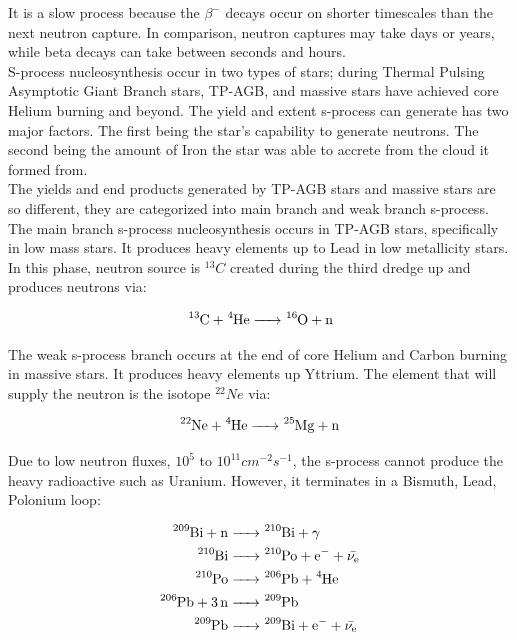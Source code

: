 \documentclass{article}
\begin{document}
 It is a slow process because the $\beta^{-}$ decays occur on shorter timescales than the next neutron capture. In comparison, 
neutron captures may take days or years, while beta decays can take between seconds and hours.\\

 S-process nucleosynthesis occur in two types of stars; during Thermal Pulsing Asymptotic Giant Branch stars, TP-AGB, and massive stars 
have achieved core Helium burning and beyond. The yield and extent s-process can generate has two major factors. The first being the 
star's capability to generate neutrons. The second being the amount of Iron the star was able to accrete from the cloud it formed from.\\

 The yields and end products generated by TP-AGB stars and massive stars are so different, they are categorized into main branch and weak 
branch s-process. The main branch s-process nucleosynthesis occurs in TP-AGB stars, specifically in low mass stars. It produces heavy 
elements up to Lead in low metallicity stars. In this phase, neutron source is $^{13}C$ created during the third dredge up \cite{kww} and 
produces neutrons via:

\begin{equation*}
\ce{^13C + ^4He -> ^16O + n} 
\end{equation*}

 The weak s-process branch occurs at the end of core Helium and Carbon burning in massive stars. It produces heavy elements up Yttrium.
The element that will supply the neutron is the isotope $^{22}Ne$ via:

\begin{equation*}
    \ce{^22Ne + ^4He -> ^25Mg + n}
\end{equation*}

 Due to low neutron fluxes, $10^{5}$ to $10^{11} cm^{-2}s^{-1}$, the s-process cannot produce the heavy radioactive such as Uranium. 
However, it terminates in a Bismuth, Lead, Polonium loop:

\begin{align*}
    \ce{^209Bi + n &-> ^210Bi + \gamma}\\
    \ce{^210Bi &-> ^210Po + e^- + \bar{\nu_{e}}}\\
    \ce{^210Po &-> ^206Pb + ^4He}\\
    \ce{^206Pb + 3n &-> ^209Pb}\\
    \ce{^209Pb &-> ^209Bi + e^- + \bar{\nu_{e}}}
\end{align*}
\end{document}
